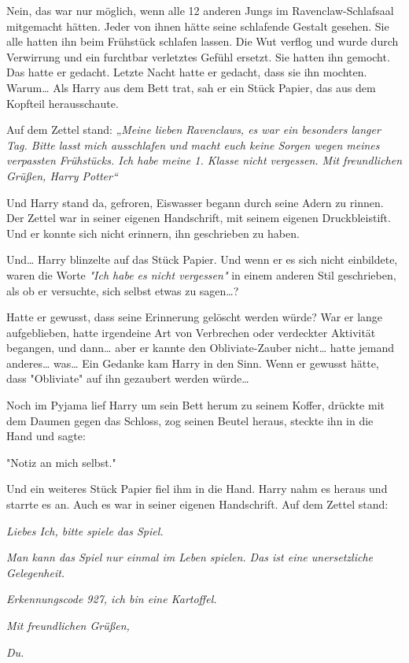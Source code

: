 {Nein, das war nur möglich, wenn alle 12 anderen Jungs im Ravenclaw-Schlafsaal mitgemacht hätten. Jeder von ihnen hätte seine schlafende Gestalt gesehen. Sie alle hatten ihn beim Frühstück schlafen lassen. Die Wut verflog und wurde durch Verwirrung und ein furchtbar verletztes Gefühl ersetzt. Sie hatten ihn gemocht. Das hatte er gedacht. Letzte Nacht hatte er gedacht, dass sie ihn mochten. Warum… Als Harry aus dem Bett trat, sah er ein Stück Papier, das aus dem Kopfteil herausschaute.

Auf dem Zettel stand: „\emph{Meine lieben Ravenclaws, es war ein besonders langer Tag. Bitte lasst mich ausschlafen und macht euch keine Sorgen wegen meines verpassten Frühstücks. Ich habe meine 1. Klasse nicht vergessen. Mit freundlichen Grüßen, Harry Potter“}

Und Harry stand da, gefroren, Eiswasser begann durch seine Adern zu rinnen. Der Zettel war in seiner eigenen Handschrift, mit seinem eigenen Druckbleistift. Und er konnte sich nicht erinnern, ihn geschrieben zu haben.

Und… Harry blinzelte auf das Stück Papier. Und wenn er es sich nicht einbildete, waren die Worte \emph{"Ich habe es nicht vergessen"} in einem anderen Stil geschrieben, als ob er versuchte, sich selbst etwas zu sagen…?

Hatte er gewusst, dass seine Erinnerung gelöscht werden würde? War er lange aufgeblieben, hatte irgendeine Art von Verbrechen oder verdeckter Aktivität begangen, und dann… aber er kannte den Obliviate-Zauber nicht… hatte jemand anderes… was… Ein Gedanke kam Harry in den Sinn. Wenn er gewusst hätte, dass "Obliviate" auf ihn gezaubert werden würde…

Noch im Pyjama lief Harry um sein Bett herum zu seinem Koffer, drückte mit dem Daumen gegen das Schloss, zog seinen Beutel heraus, steckte ihn in die Hand und sagte:

"Notiz an mich selbst."

Und ein weiteres Stück Papier fiel ihm in die Hand. Harry nahm es heraus und starrte es an. Auch es war in seiner eigenen Handschrift. Auf dem Zettel stand:

\emph{Liebes Ich, bitte spiele das Spiel.}

\emph{Man kann das Spiel nur einmal im Leben spielen. Das ist eine unersetzliche Gelegenheit.}

\emph{Erkennungscode 927, ich bin eine Kartoffel.}

\emph{Mit freundlichen Grüßen,}

\emph{Du.}

}
